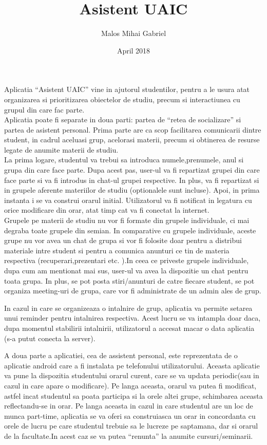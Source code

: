 \documentclass[12pts, letterpaper]{article}
\title{Asistent UAIC}
\author{Malos Mihai Gabriel }
\date{April 2018}
\begin{document}
\maketitle
    Aplicatia “Asistent UAIC” vine in ajutorul studentilor, pentru a le usura atat organizarea si prioritizarea obiectelor de studiu, precum si interactiunea cu grupul din care fac parte.\\

    Aplicatia poate fi separate in doua parti: partea de “retea de socializare” si partea de asistent personal.
	Prima parte are ca scop  facilitarea comunicarii dintre student, in cadrul aceluasi grup, acelorasi materii, precum si obtinerea de resurse legate de anumite materii de studiu.	\\
	
	
    La prima logare, studentul va trebui sa introduca numele,prenumele, anul si grupa din care face parte. Dupa acest pas, user-ul va fi repartizat grupei din care face parte si va fi introdus in chat-ul grupei respective. In plus, va fi repartizat si in grupele aferente materiilor de studiu (optionalele sunt incluse). Apoi, in prima instanta i se va construi orarul initial. Utilizatorul va fi notificat in legatura cu orice modificare din orar, atat timp cat va fi conectat la internet.\\


	Grupele pe materii de studiu nu vor  fi  formate din grupele individuale, ci mai degraba toate grupele din semian. In comparative cu grupele individuale, aceste grupe nu vor avea un chat de grupa si vor fi folosite doar pentru a distribui materiale intre student si pentru a comunica anunturi ce tin de materia respectiva (recuperari,prezentari etc. ).In ceea ce priveste grupele individuale, dupa cum am mentionat mai sus, user-ul va avea la dispozitie un chat pentru toata grupa. In plus, se pot posta stiri/anunturi de catre fiecare student, se pot organiza meeting-uri de grupa, care vor fi administrate de un admin ales de grup.
	
	
	In cazul in care se organizeaza o intalnire de grup, aplicatia va permite setarea unui reminder pentru intalnirea respectiva. Acest lucru se va intampla doar daca, dupa momentul stabilirii intalnirii, utilizatorul a accesat macar o data aplicatia (s-a putut conecta la server).
	
	
	A doua parte a aplicatiei, cea de assistent personal, este reprezentata de o aplicatie android care a fi instalata pe telefonului utilizatorului. Aceasta aplicatie va pune la dispozitia studentului orarul curent, care se va updata periodic(sau in cazul in care apare o modificare). Pe langa aceasta, orarul va putea fi modificat, astfel incat studentul sa poata participa si la orele altei grupe, schimbarea aceasta reflectandu-se in orar. Pe langa aceasta in cazul in care studentul are un loc de munca part-time, aplicatia se va oferi sa construiasca un orar in concordanta cu orele de lucru pe care studentul trebuie sa le lucreze pe saptamana, dar si orarul de la facultate.In acest caz se va putea “renunta” la anumite cursuri/seminarii.
\end{document}
